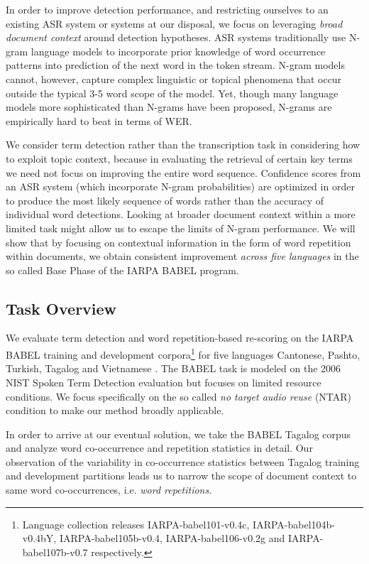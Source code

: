 \documentclass[11pt]{article}
\begin{document}
In order to improve detection performance, and restricting ourselves to an existing ASR system or systems at our disposal, we focus on leveraging \textit{broad document context} around detection hypotheses.  ASR systems traditionally use N-gram language models to incorporate prior knowledge of word occurrence patterns into prediction of the next word in the token stream.  N-gram models cannot, however, capture complex linguistic or topical phenomena that occur outside the typical 3-5 word scope of the model.  Yet, though many language models more sophisticated than N-grams have been proposed, N-grams are empirically hard to beat in terms of WER.  

We consider term detection rather than the transcription task in considering how to exploit topic context, because in evaluating the retrieval of certain key terms we need not focus on improving the entire word sequence.  Confidence scores from an ASR system (which incorporate N-gram probabilities) are optimized in order to produce the most likely sequence of words rather than the accuracy of individual word detections.  Looking at broader document context within a more limited task might allow us to escape the limits of N-gram performance.  We will show that by focusing on contextual information in the form of word repetition within documents, we obtain consistent improvement \textit{across five languages} in the so called Base Phase of the {\small IARPA BABEL} program.

\subsection{Task Overview}
We evaluate term detection and word repetition-based re-scoring on the {\small IARPA BABEL} training and development corpora\footnote{Language collection releases IARPA-babel101-v0.4c, IARPA-babel104b-v0.4bY, IARPA-babel105b-v0.4, IARPA-babel106-v0.2g and IARPA-babel107b-v0.7 respectively.} for five languages Cantonese, Pashto, Turkish, Tagalog and Vietnamese \cite{babel}.  The {\small BABEL} task is modeled on the 2006 NIST Spoken Term Detection evaluation \cite{std06eval} but focuses on limited resource conditions.  We focus specifically on the so called \emph{no target audio reuse} (NTAR) condition to make our method broadly applicable.

In order to arrive at our eventual solution, we take the {\small BABEL} Tagalog corpus and analyze word co-occurrence and repetition statistics in detail.  Our observation of the variability in co-occurrence statistics between Tagalog training and development partitions leads us to narrow the scope of document context to same word co-occurrences, i.e. \textit{word repetitions}.  
\end{document}
